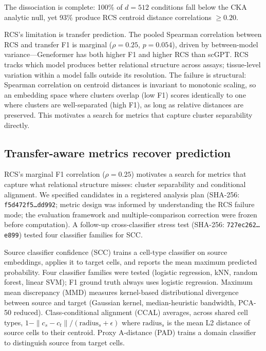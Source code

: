 \documentclass[11pt]{article}
\begin{document}
The dissociation is complete: 100\% of $d = 512$ conditions fall below
the CKA analytic null, yet 93\% produce RCS centroid distance
correlations $\geq 0.20$.

RCS's limitation is transfer prediction. The pooled Spearman correlation
between RCS and transfer F1 is marginal ($\rho = 0.25$, $p = 0.054$),
driven by between-model variance---Geneformer has both higher F1 and
higher RCS than scGPT. RCS tracks which model produces better relational
structure across assays; tissue-level variation within a model falls
outside its resolution. The failure is structural: Spearman correlation
on centroid distances is invariant to monotonic scaling, so an embedding
space where clusters overlap (low F1) scores identically to one where
clusters are well-separated (high F1), as long as relative distances are
preserved. This motivates a search for metrics that capture cluster
separability directly.


\subsection{Transfer-aware metrics recover prediction}
\label{sec:scc}

RCS's marginal F1 correlation ($\rho = 0.25$) motivates a search for
metrics that capture what relational structure misses: cluster
separability and conditional alignment. We specified candidates in
a registered analysis plan (SHA-256:
\texttt{f5d472f5\ldots dd992}; metric design was informed by
understanding the RCS failure mode; the evaluation framework and
multiple-comparison correction were frozen before computation). A
follow-up cross-classifier stress test (SHA-256:
\texttt{727ec262\ldots e899}) tested four classifier families for SCC.

Source classifier confidence (SCC) trains a cell-type classifier on
source embeddings, applies it to target cells, and reports the mean
maximum predicted probability. Four classifier families were tested
(logistic regression, kNN, random forest, linear SVM); F1 ground truth
always uses logistic regression. Maximum mean discrepancy (MMD) measures kernel-based
distributional divergence between source and target (Gaussian kernel,
median-heuristic bandwidth, PCA-50 reduced). Class-conditional alignment
(CCAL) averages, across shared cell types, $1 - \|c_s - c_t\| /
(\text{radius}_s + \epsilon)$ where $\text{radius}_s$ is the mean L2
distance of source cells to their centroid. Proxy A-distance (PAD)
trains a domain classifier to distinguish source from target cells.
\end{document}

